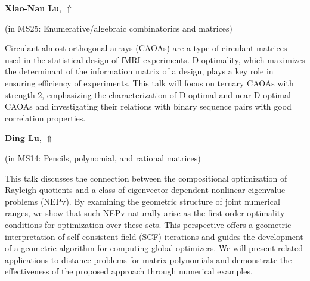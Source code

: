 \documentclass[ILAS2025-program.tex]{subfiles}
\begin{document}
\hypertarget{down0368}{}\begin{ilasabstract}
    
\textbf{Xiao-Nan Lu},  \hfill \hyperlink{up0368}{$\Uparrow$}
    
    
(in {\color{mstitle}MS25: Enumerative/algebraic combinatorics and matrices})
        
\mtskip
    Circulant almost orthogonal arrays (CAOAs) are a type of circulant matrices used in the statistical design of fMRI experiments. D-optimality, which maximizes the determinant of the information matrix of a design, plays a key role in ensuring efficiency of experiments.
This talk will focus on ternary CAOAs with strength $2$, emphasizing the characterization of D-optimal and near D-optimal CAOAs and investigating their relations with binary sequence pairs with good correlation properties.

\end{ilasabstract}
    

\hypertarget{down0371}{}\begin{ilasabstract}
    
\textbf{Ding Lu},  \hfill \hyperlink{up0371}{$\Uparrow$}
    
    
(in {\color{mstitle}MS14: Pencils, polynomial, and rational matrices})
        
\mtskip
    This talk discusses the connection between the compositional optimization of Rayleigh quotients and a class of eigenvector-dependent nonlinear eigenvalue problems (NEPv). By examining the geometric structure of joint numerical ranges, we show that such NEPv naturally arise as the first-order optimality conditions for optimization over these sets. This perspective offers a geometric interpretation of self-consistent-field (SCF) iterations and guides the development of a geometric algorithm for computing global optimizers. We will present related applications to distance problems for matrix polynomials and demonstrate the effectiveness of the proposed approach through numerical examples.
\end{ilasabstract}
    
\end{document}
